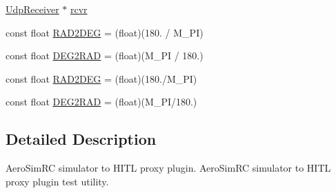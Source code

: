 \begin{DoxyCompactItemize}
\hyperlink{class_udp_receiver}{\-Udp\-Receiver} $\ast$ \hyperlink{group___aero_sim_r_c_gaad1d57ea59d2f9fca3e53c6fb20ac134}{rcvr}
\item 
const float \hyperlink{group___aero_sim_r_c_gabb429aecc5bba8de3564e19ded7ef104}{\-R\-A\-D2\-D\-E\-G} = (float)(180. / \-M\-\_\-\-P\-I)
\item 
const float \hyperlink{group___aero_sim_r_c_gacbfd2fc3314cc3762ea0c3720979f8bc}{\-D\-E\-G2\-R\-A\-D} = (float)(\-M\-\_\-\-P\-I / 180.)
\item 
const float \hyperlink{group___aero_sim_r_c_gabb429aecc5bba8de3564e19ded7ef104}{\-R\-A\-D2\-D\-E\-G} = (float)(180./\-M\-\_\-\-P\-I)
\item 
const float \hyperlink{group___aero_sim_r_c_gacbfd2fc3314cc3762ea0c3720979f8bc}{\-D\-E\-G2\-R\-A\-D} = (float)(\-M\-\_\-\-P\-I/180.)
\end{DoxyCompactItemize}


\subsection{\-Detailed \-Description}
\-Aero\-Sim\-R\-C simulator to \-H\-I\-T\-L proxy plugin. \-Aero\-Sim\-R\-C simulator to \-H\-I\-T\-L proxy plugin test utility. 

